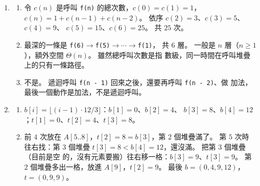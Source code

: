 \begin{enumerate}
$k = 1$：只有一輪，開始時有 $s + 1 = s + 2 \cdot 1 - 1$ 個，pop 出來直接搬，沒有動到
下面。

$k \ge 2$：第一輪開始時有 $s + 1$ 個。 pop 出這個工作、push 三個之後，由底到頂是
「下面 $s$ 個、$(k - 1)$、$(1)$、$(k - 1)$」，共 $s + 3$ 個。 接著依序做三個工作，
每個都套用歸納假設：
\begin{itemize}
\item 頂端的 $(k - 1)$，下面有 $s + 2$ 個：最多 $(s + 2) + 2(k - 1) - 1 = s + 2k - 1$
個，而且會達到；做完時剩 $s + 2$ 個，下面沒被動過。
\item 接著的 $(1)$，下面有 $s + 1$ 個：最多 $s + 2$ 個。
\item 最後的 $(k - 1)$，下面有 $s$ 個：最多 $s + 2k - 3$ 個。
\end{itemize}
第一輪的 $s + 1$ 也不超過 $s + 2k - 1$。 所以整個過程最多 $s + 2k - 1$ 個，而且第一
段會達到；三段都不動自己下面的工作，所以原本那 $s$ 個沒被動過。

取 $s = 0$、$k = n$，就得到最多 $2n - 1$ 個，而且會達到。 達到的時刻是一路拆最上面
的工作 $(n), (n - 1), \ldots, (2)$，每拆一次多兩個，從 $1$ 個變成
$1 + 2(n - 1) = 2n - 1$ 個，和範例~\ref{ex:sq-hanoi} 印出的 \texttt{deepest} 一致。
同一個歸納也說明了迴圈版的搬動順序和遞迴版相同：兩者都是先做完第一個 $(k-1)$，
再搬最大的，再做第二個 $(k-1)$。

\item
\begin{enumerate}
\item 令 $c(n)$ 是呼叫 \texttt{f(n)} 的總次數，$c(0) = c(1) = 1$，
$c(n) = 1 + c(n - 1) + c(n - 2)$。 依序 $c(2) = 3$、$c(3) = 5$、$c(4) = 9$、
$c(5) = 15$、$c(6) = 25$。 共 $25$ 次。
\item 最深的一條是 \texttt{f(6)}$\to$\texttt{f(5)}$\to \cdots \to$\texttt{f(1)}，
共 $6$ 層。 一般是 $n$ 層（$n \ge 1$），額外空間 $\Theta(n)$。 雖然總呼叫次數是指
數級，同一時間在呼叫堆疊上的只有一條路徑。
\item 不是。 遞迴呼叫 \texttt{f(n - 1)} 回來之後，還要再呼叫 \texttt{f(n - 2)}、做
加法，最後一個動作是加法，不是遞迴呼叫。
\end{enumerate}

\item
\begin{enumerate}
\item $b[i] = \lfloor (i-1) \cdot 12 / 3 \rfloor$：$b[1] = 0$、$b[2] = 4$、
$b[3] = 8$、$b[4] = 12$；$t[1] = 0$、$t[2] = 4$、$t[3] = 8$。
\item 前 $4$ 次放在 $A[5..8]$，$t[2] = 8 = b[3]$，第 $2$ 個堆疊滿了。 第 $5$ 次時
往右找：第 $3$ 個堆疊 $t[3] = 8 < b[4] = 12$，還沒滿。 把第 $3$ 個堆疊（目前是空
的，沒有元素要搬）往右移一格：$b[3] = 9$、$t[3] = 9$。 第 $2$ 個堆疊多出一格，放進
$A[9]$，$t[2] = 9$。 最後 $b = (0, 4, 9, 12)$，$t = (0, 9, 9)$。
\end{enumerate}
\end{enumerate}

